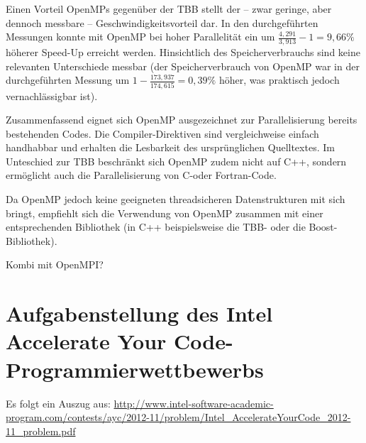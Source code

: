\documentclass[11pt]{scrartcl}
\begin{document}
Einen Vorteil OpenMPs gegenüber der TBB stellt der -- zwar geringe, aber dennoch messbare -- Geschwindigkeitsvorteil dar. In den durchgeführten Messungen konnte mit OpenMP bei hoher Parallelität ein um $\frac{4,291}{3,913}-1 = 9,66\%$ höherer Speed-Up erreicht werden. Hinsichtlich des Speicherverbrauchs sind keine relevanten Unterschiede messbar (der Speicherverbrauch von OpenMP war in der durchgeführten Messung um $1-\frac{173,937}{174,615} = 0,39\%$ höher, was praktisch jedoch vernachlässigbar ist).

Zusammenfassend eignet sich OpenMP ausgezeichnet zur Parallelisierung bereits besteh\-enden Codes. Die Compiler-Direktiven sind vergleichweise einfach handhabbar und erhalten die Lesbarkeit des ursprünglichen Quelltextes. Im Unteschied zur TBB beschränkt sich OpenMP zudem nicht auf C++, sondern ermöglicht auch die Parallelisierung von C-oder Fortran-Code.

Da OpenMP jedoch keine geeigneten threadsicheren Datenstrukturen mit sich bringt, empfiehlt sich die Verwendung von OpenMP zusammen mit einer entsprechenden Bibliothek (in C++ beispielsweise die TBB- oder die Boost-Bibliothek).

Kombi mit OpenMPI?

\pagebreak %

\fancyhead[R]{}

\thispagestyle{empty}

\renewcommand*{\biburlprefix}{(URL: }
\renewcommand*{\biburlsuffix}{)}

\pagebreak
{} %


\appendix

\section{Aufgabenstellung des Intel Accelerate Your Code-Programmierwettbewerbs}

\label{intel_ayc_problem}

Es folgt ein Auszug aus:
\url{http://www.intel-software-academic-program.com/contests/ayc/2012-11/problem/Intel_AccelerateYourCode_2012-11_problem.pdf}
\end{document}
